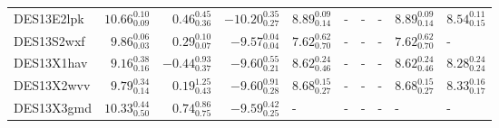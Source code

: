 \documentclass[fleqn,usenatbib,]{mnras}
\begin{document}
\begin{table}
\begin{threeparttable}
\begin{tabular}{lrrrllllll}
DES13E2lpk  &  $10.66 _{\scriptscriptstyle 0.09} ^{\scriptscriptstyle 0.10}$ &   $0.46 _{\scriptscriptstyle 0.36} ^{\scriptscriptstyle 0.45}$ &  $-10.20 _{\scriptscriptstyle 0.27} ^{\scriptscriptstyle 0.35}$ &  $8.89 _{\scriptscriptstyle 0.14} ^{\scriptscriptstyle 0.09}$ &                                                             - &                                                             - &                                                             - &  $8.89 _{\scriptscriptstyle 0.14} ^{\scriptscriptstyle 0.09}$ &  $8.54 _{\scriptscriptstyle 0.15} ^{\scriptscriptstyle 0.11}$ \\
DES13S2wxf  &   $9.86 _{\scriptscriptstyle 0.03} ^{\scriptscriptstyle 0.06}$ &   $0.29 _{\scriptscriptstyle 0.07} ^{\scriptscriptstyle 0.10}$ &   $-9.57 _{\scriptscriptstyle 0.04} ^{\scriptscriptstyle 0.04}$ &  $7.62 _{\scriptscriptstyle 0.70} ^{\scriptscriptstyle 0.62}$ &                                                             - &                                                             - &                                                             - &  $7.62 _{\scriptscriptstyle 0.70} ^{\scriptscriptstyle 0.62}$ &                                                             - \\
DES13X1hav  &   $9.16 _{\scriptscriptstyle 0.16} ^{\scriptscriptstyle 0.38}$ &  $-0.44 _{\scriptscriptstyle 0.37} ^{\scriptscriptstyle 0.93}$ &   $-9.60 _{\scriptscriptstyle 0.21} ^{\scriptscriptstyle 0.55}$ &  $8.62 _{\scriptscriptstyle 0.46} ^{\scriptscriptstyle 0.24}$ &                                                             - &                                                             - &                                                             - &  $8.62 _{\scriptscriptstyle 0.46} ^{\scriptscriptstyle 0.24}$ &  $8.28 _{\scriptscriptstyle 0.24} ^{\scriptscriptstyle 0.24}$ \\
DES13X2wvv  &   $9.79 _{\scriptscriptstyle 0.14} ^{\scriptscriptstyle 0.34}$ &   $0.19 _{\scriptscriptstyle 0.43} ^{\scriptscriptstyle 1.25}$ &   $-9.60 _{\scriptscriptstyle 0.28} ^{\scriptscriptstyle 0.91}$ &  $8.68 _{\scriptscriptstyle 0.27} ^{\scriptscriptstyle 0.15}$ &                                                             - &                                                             - &                                                             - &  $8.68 _{\scriptscriptstyle 0.27} ^{\scriptscriptstyle 0.15}$ &  $8.33 _{\scriptscriptstyle 0.17} ^{\scriptscriptstyle 0.16}$ \\
DES13X3gmd  &  $10.33 _{\scriptscriptstyle 0.50} ^{\scriptscriptstyle 0.44}$ &   $0.74 _{\scriptscriptstyle 0.75} ^{\scriptscriptstyle 0.86}$ &   $-9.59 _{\scriptscriptstyle 0.25} ^{\scriptscriptstyle 0.42}$ &                                                             - &                                                             - &                                                             - &                                                             - &                                                             - &                                                             - \\

\end{tabular}
\end{threeparttable}
\end{table}
\end{document}
